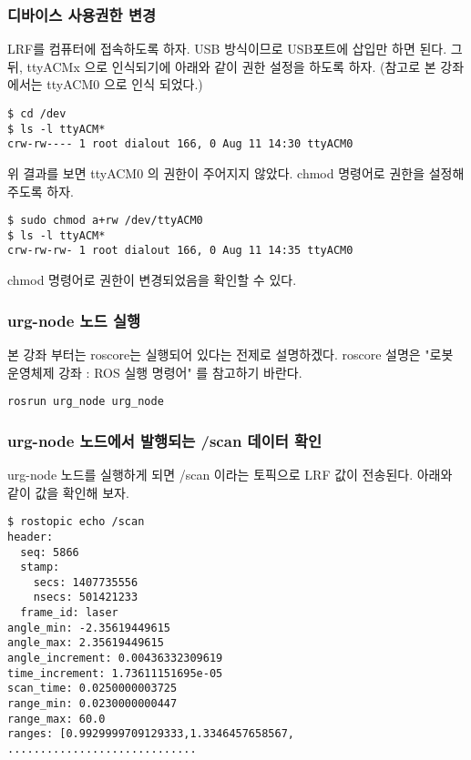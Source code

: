 \subsubsection{디바이스 사용권한 변경}

LRF를 컴퓨터에 접속하도록 하자. USB 방식이므로 USB포트에 삽입만 하면 된다. 그 뒤, ttyACMx 으로 인식되기에 아래와 같이 권한 설정을 하도록 하자. (참고로 본 강좌에서는 ttyACM0 으로 인식 되었다.)

\begin{lstlisting}[language=ROS]
$ cd /dev
$ ls -l ttyACM*
crw-rw---- 1 root dialout 166, 0 Aug 11 14:30 ttyACM0
\end{lstlisting}

위 결과를 보면 ttyACM0 의 권한이 주어지지 않았다. chmod 명령어로 권한을 설정해 주도록 하자.

\begin{lstlisting}[language=ROS]
$ sudo chmod a+rw /dev/ttyACM0
$ ls -l ttyACM*
crw-rw-rw- 1 root dialout 166, 0 Aug 11 14:35 ttyACM0
\end{lstlisting}

chmod 명령어로 권한이 변경되었음을 확인할 수 있다.

\subsubsection{urg-node 노드 실행}

본 강좌 부터는 roscore는 실행되어 있다는 전제로 설명하겠다. roscore 설명은 "로봇 운영체제 강좌 : ROS 실행 명령어" 를 참고하기 바란다.

\begin{lstlisting}[language=ROS]
rosrun urg_node urg_node 
\end{lstlisting}

\subsubsection{urg-node 노드에서 발행되는 /scan 데이터 확인}

urg-node 노드를 실행하게 되면 /scan 이라는 토픽으로 LRF 값이 전송된다. 아래와 같이 값을 확인해 보자. 

\begin{lstlisting}[language=ROS]
$ rostopic echo /scan
header: 
  seq: 5866
  stamp: 
    secs: 1407735556
    nsecs: 501421233
  frame_id: laser
angle_min: -2.35619449615
angle_max: 2.35619449615
angle_increment: 0.00436332309619
time_increment: 1.73611151695e-05
scan_time: 0.0250000003725
range_min: 0.0230000000447
range_max: 60.0
ranges: [0.9929999709129333,1.3346457658567, .............................
\end{lstlisting}

